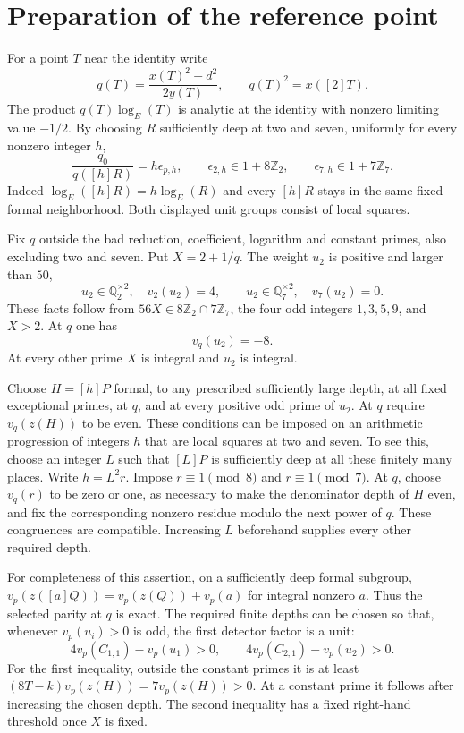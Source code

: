 \documentclass[11pt,a4paper]{article}
\newcommand{\Q}{\mathbb Q}\newcommand{\Z}{\mathbb Z}
\begin{document}
\section{Preparation of the reference point}

For a point $T$ near the identity write
\[
                q(T)=\frac{x(T)^2+d^2}{2y(T)},
                       \qquad q(T)^2=x([2]T).
\]
The product $q(T)\log_E(T)$ is analytic at the identity with
nonzero limiting value $-1/2$. By choosing $R$ sufficiently
deep at two and seven, uniformly for every nonzero integer $h$,
\begin{equation}\label{eq:square-ratio}
 \frac{q_0}{q([h]R)}=h\epsilon_{p,h},\qquad
 \epsilon_{2,h}\in1+8\Z_2,\qquad
 \epsilon_{7,h}\in1+7\Z_7.
\end{equation}
Indeed $\log_E([h]R)=h\log_E(R)$ and every $[h]R$ stays in
the same fixed formal neighborhood.
Both displayed unit groups consist of local squares.

Fix $q$ outside the bad reduction, coefficient, logarithm and
constant primes, also excluding two and seven. Put $X=2+1/q$.
The weight $u_2$ is positive and larger than $50$,
\[
 u_2\in\Q_2^{\times2},\quad v_2(u_2)=4,\qquad
 u_2\in\Q_7^{\times2},\quad v_7(u_2)=0.
\]
These facts follow from $56X\in8\Z_2\cap7\Z_7$, the four
odd integers $1,3,5,9$, and $X>2$. At $q$ one has
\[
                            v_q(u_2)=-8.
\]
At every other prime $X$ is integral and $u_2$ is integral.

Choose $H=[h]P$ formal, to any prescribed sufficiently large
depth, at all fixed exceptional primes, at $q$, and at every
positive odd prime of $u_2$. At $q$ require
$v_q(z(H))$ to be even. These conditions can be imposed on
an arithmetic progression of integers $h$ that are local squares
at two and seven. To see this, choose an integer $L$ such that
$[L]P$ is sufficiently deep at all these finitely many places.
Write $h=L^2r$. Impose $r\equiv1\pmod8$ and
$r\equiv1\pmod7$. At $q$, choose $v_q(r)$ to be zero or one,
as necessary to make the denominator depth of $H$ even, and
fix the corresponding nonzero residue modulo the next power
of $q$. These congruences are compatible. Increasing $L$
beforehand supplies every other required depth.

For completeness of this assertion, on a sufficiently deep
formal subgroup,
$v_p(z([a]Q))=v_p(z(Q))+v_p(a)$ for integral nonzero $a$.
Thus the selected parity at $q$ is exact. The required finite
depths can be chosen so that, whenever $v_p(u_i)>0$ is odd,
the first detector factor is a unit:
\[
 4v_p(C_{1,1})-v_p(u_1)>0,\qquad
 4v_p(C_{2,1})-v_p(u_2)>0.
\]
For the first inequality, outside the constant primes it is
at least $(8T-k)v_p(z(H))=7v_p(z(H))>0$.
At a constant prime it follows after increasing the chosen
depth. The second inequality has a fixed right-hand threshold
once $X$ is fixed.
\end{document}
